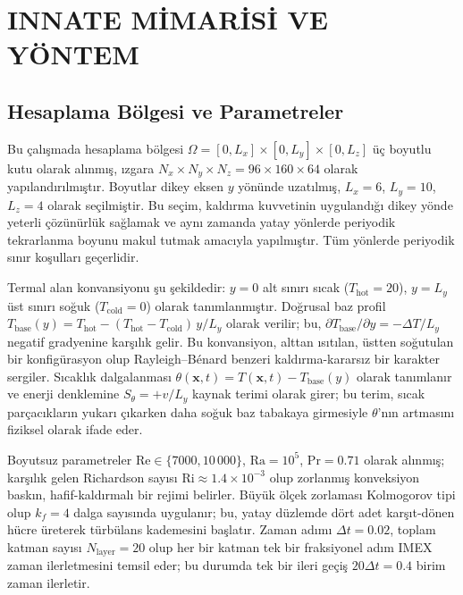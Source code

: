 \chapter{INNATE MİMARİSİ VE YÖNTEM}
\label{ch:mimari}

\section{Hesaplama Bölgesi ve Parametreler}
\label{sec:hesaplama_bolgesi}

Bu çalışmada hesaplama bölgesi $\Omega = [0,L_{x}]\times[0,L_{y}]\times[0,L_{z}]$ üç boyutlu kutu olarak alınmış, ızgara $N_{x}\times N_{y}\times N_{z} = 96\times 160\times 64$ olarak yapılandırılmıştır. Boyutlar dikey eksen $y$ yönünde uzatılmış, $L_{x}=6$, $L_{y}=10$, $L_{z}=4$ olarak seçilmiştir. Bu seçim, kaldırma kuvvetinin uygulandığı dikey yönde yeterli çözünürlük sağlamak ve aynı zamanda yatay yönlerde periyodik tekrarlanma boyunu makul tutmak amacıyla yapılmıştır. Tüm yönlerde periyodik sınır koşulları geçerlidir.

Termal alan konvansiyonu şu şekildedir: $y=0$ alt sınırı sıcak ($T_{\mathrm{hot}}=20$), $y=L_{y}$ üst sınırı soğuk ($T_{\mathrm{cold}}=0$) olarak tanımlanmıştır. Doğrusal baz profil $T_{\mathrm{base}}(y) = T_{\mathrm{hot}} - (T_{\mathrm{hot}}-T_{\mathrm{cold}})\,y/L_{y}$ olarak verilir; bu, $\partial T_{\mathrm{base}}/\partial y = -\Delta T/L_{y}$ negatif gradyenine karşılık gelir. Bu konvansiyon, alttan ısıtılan, üstten soğutulan bir konfigürasyon olup Rayleigh--B\'enard benzeri kaldırma-kararsız bir karakter sergiler. Sıcaklık dalgalanması $\theta(\mathbf{x},t) = T(\mathbf{x},t) - T_{\mathrm{base}}(y)$ olarak tanımlanır ve enerji denklemine $S_{\theta} = +v/L_{y}$ kaynak terimi olarak girer; bu terim, sıcak parçacıkların yukarı çıkarken daha soğuk baz tabakaya girmesiyle $\theta$'nın artmasını fiziksel olarak ifade eder.

Boyutsuz parametreler $\mathrm{Re}\in\{7000,10\,000\}$, $\mathrm{Ra}=10^{5}$, $\mathrm{Pr}=0.71$ olarak alınmış; karşılık gelen Richardson sayısı $\mathrm{Ri}\approx 1.4\times 10^{-3}$ olup zorlanmış konveksiyon baskın, hafif-kaldırmalı bir rejimi belirler. Büyük ölçek zorlaması Kolmogorov tipi olup $k_{f}=4$ dalga sayısında uygulanır; bu, yatay düzlemde dört adet karşıt-dönen hücre üreterek türbülans kademesini başlatır. Zaman adımı $\Delta t = 0.02$, toplam katman sayısı $N_{\mathrm{layer}}=20$ olup her bir katman tek bir fraksiyonel adım IMEX zaman ilerletmesini temsil eder; bu durumda tek bir ileri geçiş $20\Delta t = 0.4$ birim zaman ilerletir.

